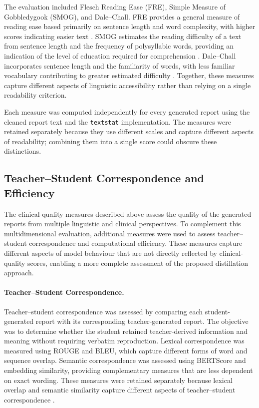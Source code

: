 \documentclass[ %
                    author={Aman Kumar Singh},
                supervisor={Dr. Edwin Simpson},
                    degree={MSc},
                     title={Quality-Aware Knowledge Distillation of Large Language Models for Efficient Personalised Clinical Report Generation},
                  subtitle={},
                      type={},
                      year={2021}]{dissertation}
\begin{document}
The evaluation included Flesch Reading Ease (FRE), Simple Measure of
Gobbledygook (SMOG), and Dale--Chall. FRE provides a general measure of
reading ease based primarily on sentence length and word complexity, with
higher scores indicating easier text \cite{flesch_new_1948}. SMOG estimates
the reading difficulty of a text from sentence length and the frequency of
polysyllabic words, providing an indication of the level of education
required for comprehension \cite{mclaughlin_smog_1969}. Dale--Chall
incorporates sentence length and the familiarity of words, with less
familiar vocabulary contributing to greater estimated difficulty
\cite{crossley_large-scaled_2023}. Together, these measures capture
different aspects of linguistic accessibility rather than relying on a
single readability criterion.

Each measure was computed independently for every generated report using
the cleaned report text and the \texttt{textstat} implementation. The
measures were retained separately because they use different scales and
capture different aspects of readability; combining them into a single
score could obscure these distinctions.



\subsection{Teacher--Student Correspondence and Efficiency}
\label{sec:complementary_evaluation}

The clinical-quality measures described above assess the quality of the
generated reports from multiple linguistic and clinical perspectives.
To complement this multidimensional evaluation, additional measures were
used to assess teacher--student correspondence and computational efficiency.
These measures capture different aspects of model behaviour that are not
directly reflected by clinical-quality scores, enabling a more complete
assessment of the proposed distillation approach.

\paragraph{Teacher--Student Correspondence.}

Teacher--student correspondence was assessed by comparing each
student-generated report with its corresponding teacher-generated report.
The objective was to determine whether the student retained teacher-derived
information and meaning without requiring verbatim reproduction. Lexical
correspondence was measured using ROUGE and BLEU, which capture different
forms of word and sequence overlap. Semantic correspondence was assessed
using BERTScore and embedding similarity, providing complementary measures
that are less dependent on exact wording. These measures were retained
separately because lexical overlap and semantic similarity capture
different aspects of teacher--student correspondence \cite{lin_rouge_2004, ward_bleu_2001, zhang_bertscore_2020}.
\end{document}
